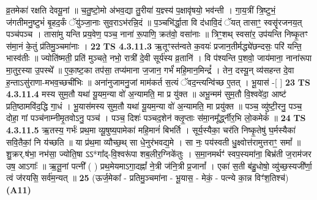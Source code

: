 \documentclass[17pt]{extarticle}
\begin{document}
                  व्र॒तमेका॑ रक्षति देवयू॒नां ॥ च॒तु॒ष्टो॒मो अ॑भव॒द्या तु॒रीया॑ य॒ज्ञ्स्य॑ प॒क्षावृ॑षयो॒ भव॑न्ती । गा॒य॒त्रीं त्रि॒ष्टुभं॒ ज॑गतीमनु॒ष्टुभं॑ बृ॒हद॒र्कं ॅयु॑ञ्जा॒नाः सुव॒राऽभ॑रन्नि॒दं ॥ प॒ञ्चभि॑र्द्धा॒ता वि द॑धावि॒दं ॅयत् तासाꣳ॒॒ स्वसॄ॑रजनय॒त् पञ्च॑पञ्च । तासा॑मु यन्ति प्रय॒वेण॒ पञ्च॒ नाना॑ रू॒पाणि॒ क्रत॑वो॒ वसा॑नाः ॥ त्रिꣳ॒॒शथ् स्वसा॑र॒ उप॑यन्ति निष्कृ॒तꣳ स॑मा॒नं के॒तुं प्र॑तिमु॒ञ्चमा॑नाः । \textbf{  22} \newline
                  \newline
                                \textbf{ TS 4.3.11.3} \newline
                  ऋ॒तूꣳस्त॑न्वते क॒वयः॑ प्रजान॒तीर्मद्ध्ये॑छन्दसः॒ परि॑ यन्ति॒ भास्व॑तीः ॥ ज्योति॑ष्मती॒ प्रति॑ मुञ्चते॒ नभो॒ रात्री॑ दे॒वी सूर्य॑स्य व्र॒तानि॑ । वि प॑श्यन्ति प॒शवो॒ जाय॑माना॒ नाना॑रूपा मा॒तुर॒स्या उ॒पस्थे᳚ ॥ ए॒का॒ष्ट॒का तप॑सा॒ तप्य॑माना ज॒जान॒ गर्भं॑ महि॒मान॒मिन्द्रं᳚ । तेन॒ दस्यू॒न् व्य॑सहन्त दे॒वा ह॒न्ताऽसु॑राणा-मभव॒च्छची॑भिः ॥ अना॑नुजामनु॒जां माम॑कर्त स॒त्यं ॅवद॒न्त्यन्वि॑च्छ ए॒तत् । भू॒यास॑ -[  ] \textbf{  23} \newline
                  \newline
                                \textbf{ TS 4.3.11.4} \newline
                  मस्य सुम॒तौ यथा॑ यू॒यम॒न्या वो॑ अ॒न्यामति॒ मा प्र यु॑क्त ॥ अभू॒न्मम॑ सुम॒तौ वि॒श्ववे॑दा॒ आष्ट॑ प्रति॒ष्ठामवि॑द॒द्धि गा॒धं । भू॒यास॑मस्य सुम॒तौ यथा॑ यू॒यम॒न्या वो॑ अ॒न्यामति॒ मा प्रयु॑क्त ॥ पञ्च॒ व्यु॑ष्टी॒रनु॒ पञ्च॒ दोहा॒ गां पञ्च॑नाम्नीमृ॒तवोऽनु॒ पञ्च॑ । पञ्च॒ दिशः॑ पञ्चद॒शेन॑ क्लृ॒प्ताः स॑मा॒नमू᳚र्द्ध्नीर॒भि लो॒कमेकं᳚ ॥ \textbf{  24} \newline
                  \newline
                                \textbf{ TS 4.3.11.5} \newline
                  ऋ॒तस्य॒ गर्भः॑ प्रथ॒मा व्यू॒षुष्य॒पामेका॑ महि॒मानं॑ बिभर्ति । सूर्य॒स्यैका॒ चर॑ति निष्कृ॒तेषु॑ घ॒र्मस्यैका॑ सवि॒तैकां॒ नि य॑च्छति ॥ या प्र॑थ॒मा व्यौच्छ॒थ् सा धे॒नुर॑भवद्य॒मे । सा नः॒ पय॑स्वती धु॒क्ष्वोत्त॑रामुत्तराꣳ॒॒ समां᳚ ॥ शु॒क्रर्.ष॑भा॒ नभ॑सा॒ ज्योति॒षा ऽऽ*गा᳚द्-वि॒श्वरू॑पा शब॒लीर॒ग्निके॑तुः । स॒मा॒नमर्थꣳ॑ स्वप॒स्यमा॑ना॒ बिभ्र॑ती ज॒राम॑जर उष॒ आऽगाः᳚ ॥ ऋ॒तू॒नां पत्नी᳚ ( ) प्रथ॒मेयमाऽगा॒दह्नां᳚ ने॒त्री ज॑नि॒त्री प्र॒जानां᳚ । एका॑ स॒ती ब॑हु॒धोषो॒ व्यु॑च्छ॒स्यजी᳚र्णा॒ त्वं ज॑रयसि॒ सर्व॑म॒न्यत् ॥ \textbf{  25 } \newline
                  \newline
                      (ऊर्ज॒मेका᳚ - प्रतिमु॒ञ्चमा॑ना - भू॒यास॒ - मेकं॒ - पत्न्ये का॒न्न विꣳ॑श॒तिश्च॑)  \textbf{(A11)} \newline \newline
\end{document}
